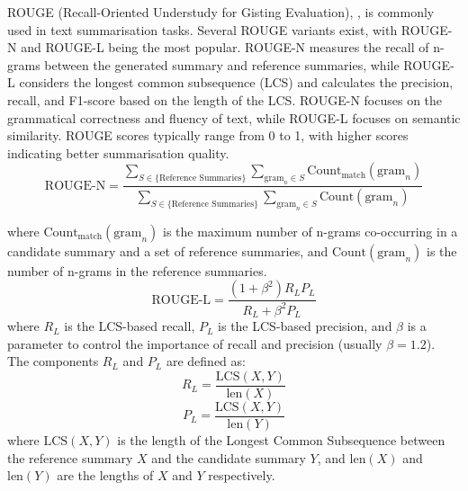ROUGE (Recall-Oriented Understudy for Gisting Evaluation), \cite{lin2004rouge}, is commonly used in text summarisation tasks. Several ROUGE variants exist, with ROUGE-N and ROUGE-L being the most popular. ROUGE-N measures the recall of n-grams between the generated summary and reference summaries, while ROUGE-L considers the longest common subsequence (LCS) and calculates the precision, recall, and F1-score based on the length of the LCS. ROUGE-N focuses on the grammatical correctness and fluency of text, while ROUGE-L focuses on semantic similarity. ROUGE scores typically range from 0 to 1, with higher scores indicating better summarisation quality.\\


\begin{equation}
    \text{ROUGE-N} = \frac{\sum_{S \in \{\text{Reference Summaries}\}} \sum_{\text{gram}_n \in S} \text{Count}_\text{match}(\text{gram}_n)}{\sum_{S \in \{\text{Reference Summaries}\}} \sum_{\text{gram}_n \in S} \text{Count}(\text{gram}_n)}
\end{equation}

\noindent where $\text{Count}_\text{match}(\text{gram}_n)$ is the maximum number of n-grams co-occurring in a candidate summary and a set of reference summaries, and $\text{Count}(\text{gram}_n)$ is the number of n-grams in the reference summaries.\\


\begin{equation}
    \text{ROUGE-L} = \frac{(1 + \beta^2)R_L P_L}{R_L + \beta^2 P_L}
\end{equation}
\noindent where $R_L$ is the LCS-based recall, $P_L$ is the LCS-based precision, and $\beta$ is a parameter to control the importance of recall and precision (usually $\beta = 1.2$).\\

\noindent The components $R_L$ and $P_L$ are defined as:
\begin{equation}
    R_L = \frac{\text{LCS}(X,Y)}{\text{len}(X)}
\end{equation}
\begin{equation}
    P_L = \frac{\text{LCS}(X,Y)}{\text{len}(Y)}
\end{equation}
\noindent where $\text{LCS}(X,Y)$ is the length of the Longest Common Subsequence between the reference summary $X$ and the candidate summary $Y$, and $\text{len}(X)$ and $\text{len}(Y)$ are the lengths of $X$ and $Y$ respectively.\\

